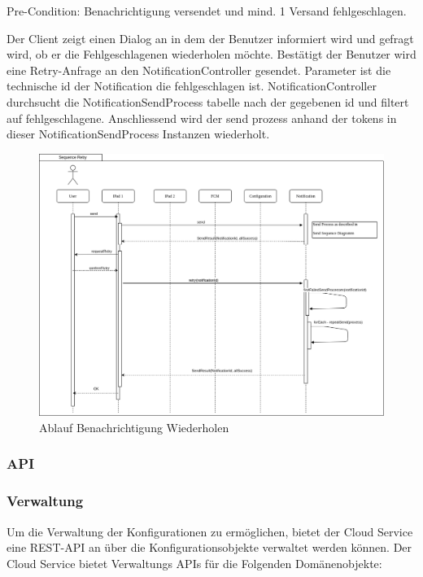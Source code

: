 Pre-Condition: Benachrichtigung versendet und mind. 1 Versand fehlgeschlagen.

Der Client zeigt einen Dialog an in dem der Benutzer informiert wird und gefragt wird, ob er die Fehlgeschlagenen wiederholen möchte.
Bestätigt der Benutzer wird eine Retry-Anfrage an den NotificationController gesendet.
Parameter ist die technische id der Notification die fehlgeschlagen ist.
NotificationController durchsucht die NotificationSendProcess tabelle nach der gegebenen id und filtert auf fehlgeschlagene.
Anschliessend wird der send prozess anhand der tokens in dieser NotificationSendProcess Instanzen wiederholt.

\begin{figure}[h]
    \centering
    \begin{minipage}[b]{1.0\textwidth}
        \includegraphics[width=\textwidth]{graphics/Sequence_Notification_Retry}
        \caption{Ablauf Benachrichtigung Wiederholen}
    \end{minipage}
\end{figure}


\clearpage

\subsubsection{API}

\subsubsection*{Verwaltung}

Um die Verwaltung der Konfigurationen zu ermöglichen, bietet der Cloud Service eine REST-API an über die Konfigurationsobjekte verwaltet werden können.
Der Cloud Service bietet Verwaltungs APIs für die Folgenden Domänenobjekte:

